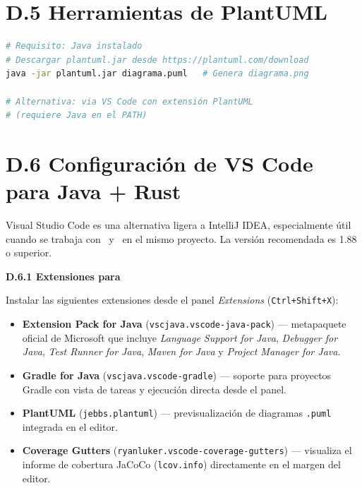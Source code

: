 \section*{D.5 Herramientas de PlantUML}

\begin{lstlisting}[style=baseStyle, language=bash,
  numbers=none, frame=none, backgroundcolor=\color{white},
  basicstyle=\ttfamily\small]
# Requisito: Java instalado
# Descargar plantuml.jar desde https://plantuml.com/download
java -jar plantuml.jar diagrama.puml   # Genera diagrama.png

# Alternativa: via VS Code con extensión PlantUML
# (requiere Java en el PATH)
\end{lstlisting}

\section*{D.6 Configuración de VS Code para Java + Rust}

\noindent
Visual Studio Code es una alternativa ligera a IntelliJ IDEA,
especialmente útil cuando se trabaja con \java\ y \rust\ en el mismo
proyecto. La versión recomendada es 1.88 o superior.

\medskip\noindent
\textbf{D.6.1 Extensiones para \java}

\noindent
Instalar las siguientes extensiones desde el panel \textit{Extensions}
(\texttt{Ctrl+Shift+X}):

\begin{itemize}
  \item \textbf{Extension Pack for Java}
    (\texttt{vscjava.vscode-java-pack}) --- metapaquete oficial de
    Microsoft que incluye \textit{Language Support for Java},
    \textit{Debugger for Java}, \textit{Test Runner for Java},
    \textit{Maven for Java} y \textit{Project Manager for Java}.
  \item \textbf{Gradle for Java}
    (\texttt{vscjava.vscode-gradle}) --- soporte para proyectos
    Gradle con vista de tareas y ejecución directa desde el panel.
  \item \textbf{PlantUML}
    (\texttt{jebbs.plantuml}) --- previsualización de diagramas
    \texttt{.puml} integrada en el editor.
  \item \textbf{Coverage Gutters}
    (\texttt{ryanluker.vscode-coverage-gutters}) --- visualiza
    el informe de cobertura JaCoCo (\texttt{lcov.info})
    directamente en el margen del editor.
\end{itemize}

